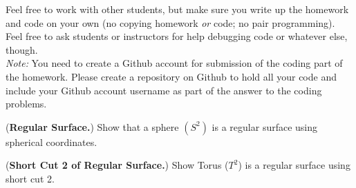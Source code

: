 \documentclass[12pt,letterpaper]{hmcpset}
\begin{document}
Feel free to work with other students, but make sure you write up the homework
and code on your own (no copying homework \textit{or} code; no pair programming).
Feel free to ask students or instructors for help debugging code or whatever else,
though.\\

\textit{Note:} You need to create a Github account for submission of the coding part of the homework. Please create a repository on Github to hold all your code and include your Github account username as part of the answer to the coding problems.

\begin{problem}[1]
(\textbf{Regular Surface.}) Show that a sphere $(S^2)$ is a regular surface using spherical coordinates.
\end{problem}
\begin{solution}
    \vfill
\end{solution}
\newpage



\begin{problem}[2]
(\textbf{Short Cut 2 of Regular Surface.}) Show Torus ($T^2$) is a regular surface using short cut 2.

\end{problem}
\begin{solution}
    \vfill
\end{solution}
\newpage
\end{document}
